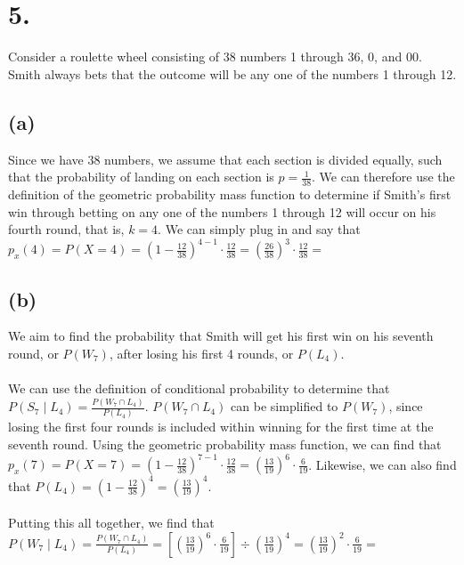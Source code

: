 \documentclass{article}
\begin{document}
\section*{5.}
{\Large 

Consider a roulette wheel consisting of 38 numbers 1 through 36, 0, and 00. Smith always bets
that the outcome will be any one of the numbers 1 through 12.

\subsection*{(a)}
Since we have 38 numbers, we assume that each section is divided equally, such that the probability of landing on each section is $p = \frac{1}{38}$. We can therefore use the definition of the geometric probability mass function to determine if Smith's first win through betting on any one of the numbers 1 through 12 will occur on his fourth round, that is, $k = 4$. We can simply plug in and say that $p_x(4) = P(X = 4) = (1 - \frac{12}{38})^{4-1} \cdot \frac{12}{38} = (\frac{26}{38})^3 \cdot \frac{12}{38} = $ 

\subsection*{(b)}
We aim to find the probability that Smith will get his first win on his seventh round, or $P(W_7)$, after losing his first 4 rounds, or $P(L_4)$. \\ \\
We can use the definition of conditional probability to determine that $P(S_7 \mid L_4) = \frac{P(W_7 \cap L_4)}{P(L_4)}$. $P(W_7 \cap L_4)$ can be simplified to $P(W_7)$, since losing the first four rounds is included within winning for the first time at the seventh round. Using the geometric probability mass function, we can find that $p_x(7) = P(X = 7) = (1 - \frac{12}{38})^{7-1} \cdot \frac{12}{38} = (\frac{13}{19})^6 \cdot \frac{6}{19}$. Likewise, we can also find that $P(L_4) = (1 - \frac{12}{38})^{4} = (\frac{13}{19})^4$. \\ \\
Putting this all together, we find that $P(W_7 \mid L_4) = \frac{P(W_7 \cap L_4)}{P(L_4)} = [(\frac{13}{19})^6 \cdot \frac{6}{19}] \div (\frac{13}{19})^4 = (\frac{13}{19})^2 \cdot \frac{6}{19} = $ 

}
\end{document}
